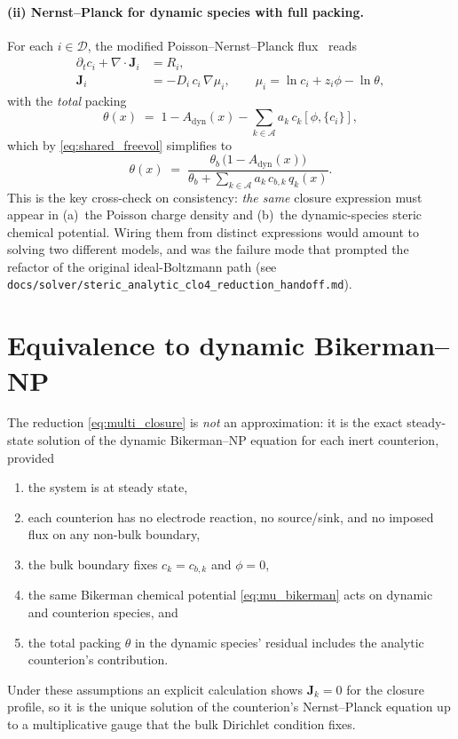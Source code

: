 \documentclass[11pt]{article}
\newcommand{\dynset}{\mathcal{D}}      %
\newcommand{\anset}{\mathcal{A}}       %
\begin{document}
\paragraph{(ii) Nernst--Planck for dynamic species with full packing.}
For each $i \in \dynset$, the modified Poisson--Nernst--Planck
flux~\cite{Kilic2007b} reads
\begin{align}
\partial_t c_i + \nabla\!\cdot\!\mathbf{J}_i &= R_i,\\
\mathbf{J}_i &= -D_i\, c_i\, \nabla \mu_i,
\qquad
\mu_i = \ln c_i + z_i\phi - \ln\theta,
\end{align}
with the \emph{total} packing
\begin{equation}
\theta(x) \;=\; 1 - A_{\mathrm{dyn}}(x) - \sum_{k\in\anset} a_k\,c_k[\phi,\{c_i\}],
\end{equation}
which by \eqref{eq:shared_freevol} simplifies to
\begin{equation}
\theta(x) \;=\;
\frac{\theta_b\,\bigl(1-A_{\mathrm{dyn}}(x)\bigr)}
     {\theta_b + \sum_{k\in\anset} a_k\,c_{b,k}\,q_k(x)}.
\end{equation}
This is the key cross-check on consistency: \emph{the same} closure
expression must appear in (a)~the Poisson charge density and
(b)~the dynamic-species steric chemical potential. Wiring them from
distinct expressions would amount to solving two different models, and
was the failure mode that prompted the refactor of the original
ideal-Boltzmann path (see
\texttt{docs/solver/steric\_analytic\_clo4\_reduction\_handoff.md}).

\section{Equivalence to dynamic Bikerman--NP}

The reduction \eqref{eq:multi_closure} is \emph{not} an approximation:
it is the exact steady-state solution of the dynamic Bikerman--NP
equation for each inert counterion, provided
\begin{enumerate}
\item the system is at steady state,
\item each counterion has no electrode reaction, no source/sink, and
no imposed flux on any non-bulk boundary,
\item the bulk boundary fixes $c_k = c_{b,k}$ and $\phi = 0$,
\item the same Bikerman chemical potential
\eqref{eq:mu_bikerman} acts on dynamic and counterion species, and
\item the total packing $\theta$ in the dynamic species' residual
includes the analytic counterion's contribution.
\end{enumerate}
Under these assumptions an explicit calculation shows
$\mathbf{J}_k = 0$ for the closure profile, so it is the unique
solution of the counterion's Nernst--Planck equation up to a
multiplicative gauge that the bulk Dirichlet condition fixes.
\end{document}
